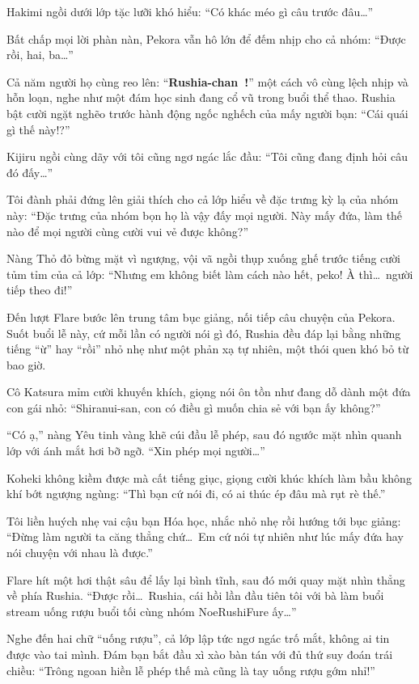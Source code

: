 \documentclass[../main.tex]{subfiles}
\begin{document}
Hakimi ngồi dưới lớp tặc lưỡi khó hiểu: ``Có khác méo gì câu trước đâu\dots''

Bất chấp mọi lời phàn nàn, Pekora vẫn hô lớn để đếm nhịp cho cả nhóm: ``Được rồi, hai, ba\dots''

Cả năm người họ cùng reo lên: ``\textbf{Rushia-chan~!}'' một cách vô cùng lệch nhịp và hỗn loạn, nghe như một đám học sinh đang cổ vũ trong buổi thể thao. Rushia bật cười ngặt nghẽo trước hành động ngốc nghếch của mấy người bạn: ``Cái quái gì thế này!?''

Kijiru ngồi cùng dãy với tôi cũng ngơ ngác lắc đầu: ``Tôi cũng đang định hỏi câu đó đấy\dots''

Tôi đành phải đứng lên giải thích cho cả lớp hiểu về đặc trưng kỳ lạ của nhóm này: ``Đặc trưng của nhóm bọn họ là vậy đấy mọi người. Này mấy đứa, làm thế nào để mọi người cùng cười vui vẻ được không?''

Nàng Thỏ đỏ bừng mặt vì ngượng, vội vã ngồi thụp xuống ghế trước tiếng cười tủm tỉm của cả lớp: ``Nhưng em không biết làm cách nào hết, peko! À thì\dots\ người tiếp theo đi!''

Đến lượt Flare bước lên trung tâm bục giảng, nối tiếp câu chuyện của Pekora. Suốt buổi lễ này, cứ mỗi lần có người nói gì đó, Rushia đều đáp lại bằng những tiếng ``ừ'' hay ``rồi'' nhỏ nhẹ như một phản xạ tự nhiên, một thói quen khó bỏ từ bao giờ.

Cô Katsura mỉm cười khuyến khích, giọng nói ôn tồn như đang dỗ dành một đứa con gái nhỏ: ``Shiranui-san, con có điều gì muốn chia sẻ với bạn ấy không?''

``Có ạ,'' nàng Yêu tinh vàng khẽ cúi đầu lễ phép, sau đó ngước mặt nhìn quanh lớp với ánh mắt hơi bỡ ngỡ. ``Xin phép mọi người\dots''

Koheki không kiềm được mà cất tiếng giục, giọng cười khúc khích làm bầu không khí bớt ngượng ngùng: ``Thì bạn cứ nói đi, có ai thúc ép đâu mà rụt rè thế.''

Tôi liền huých nhẹ vai cậu bạn Hóa học, nhắc nhỏ nhẹ rồi hướng tới bục giảng: ``Đừng làm người ta căng thẳng chứ\dots\ Em cứ nói tự nhiên như lúc mấy đứa hay nói chuyện với nhau là được.''

Flare hít một hơi thật sâu để lấy lại bình tĩnh, sau đó mới quay mặt nhìn thẳng về phía Rushia. ``Được rồi\dots\ Rushia, cái hồi lần đầu tiên tôi với bà làm buổi stream uống rượu buổi tối cùng nhóm NoeRushiFure ấy\dots''

Nghe đến hai chữ ``uống rượu'', cả lớp lập tức ngơ ngác trố mắt, không ai tin được vào tai mình. Đám bạn bắt đầu xì xào bàn tán với đủ thứ suy đoán trái chiều: ``Trông ngoan hiền lễ phép thế mà cũng là tay uống rượu gớm nhỉ!''
\end{document}
